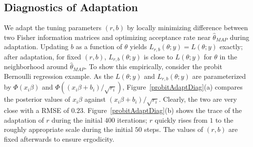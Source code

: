 \documentclass[12pt]{article}
\begin{document}
{
\subsection{Diagnostics of Adaptation}
}
We adapt the tuning parameters $(r,b)$ by locally minimizing difference between two Fisher information matrices and
 optimizing acceptance rate near 
 $\hat\theta_{MAP}$ during adaptation. Updating $b$  as a function
 of $\theta$ yields $L_{r,b}(\theta;y)=L(\theta;y)$ exactly;  after adaptation,
for  fixed
 $(r,b)$, $L_{r,b}(\theta;y)$ is close to $L(\theta;y)$ for $\theta$ in the neighborhood
 around $\hat\theta_{MAP}$. To show this empirically, consider the
 probit Bernoulli regression example. As the $L(\theta;y)$ and $L_{r,b}(\theta;y)$
 are parameterized by $\Phi(x_i\beta)$ and $\Phi(({x_i\beta+b_i})/{\sqrt{r_i}})$, Figure~\ref{probitAdaptDiag}(a) compares the posterior values of $x_i\beta$ against
$({x_i\beta+b_i})/{\sqrt{r_i}}$. Clearly, the two are very close with a
RMSE of $0.23$.
Figure~\ref{probitAdaptDiag}(b) shows the trace of the adaptation of $r$
during
the initial $400$ iterations;
$r$ quickly rises from $1$ to the roughly  appropriate scale during the
initial $50$ steps. The values of $(r,b)$ are fixed afterwards to ensure
ergodicity.
\end{document}
